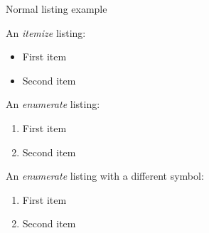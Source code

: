 \begin{frame}{Normal listing example}

An \textit{itemize} listing:

\begin{itemize}
  \item First item
  \item Second item
\end{itemize}

\vspace{0.6cm}

An \textit{enumerate} listing:

\begin{enumerate}
  \item First item
  \item Second item
\end{enumerate}

\vspace{0.6cm}

An \textit{enumerate} listing with a different symbol:

\begin{enumerate}[1)]
  \item First item
  \item Second item
\end{enumerate}

\end{frame}